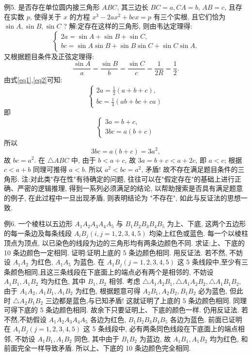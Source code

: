 例5. 是否存在单位圆内接三角形 $A B C$, 其三边长 $B C=a, C A=b$, $A B=c$, 且存在实数 $p$, 使得关于 $x$ 的方程 $x^3-2 a x^2+b c x=p$ 有三个实根, 且它们恰为 $\sin A, \sin B, \sin C$ ?
解:定存在这样的三角形, 则由韦达定理得:
$$
\left\{\begin{array}{l}
2 a=\sin A+\sin B+\sin C, \\
b c=\sin A \sin B+\sin B \sin C+\sin C \sin A .
\end{array}\right. \label{eq1}
$$
又根据题目条件及正弦定理得:
$$
\frac{\sin A}{a}=\frac{\sin B}{b}=\frac{\sin C}{c}=\frac{1}{2 R}=\frac{1}{2} .  \label{eq2}
$$
由式\ref{eq1},\ref{eq2}可知:
$$
\left\{\begin{array}{l}
2 a=\frac{1}{2}(a+b+c), \\
b c=\frac{1}{4}(a b+b c+c a) 
\end{array}\right.
$$
即
$$
\left\{\begin{array}{l}
3 a=b+c, \\
3 b c=a(b+c)
\end{array}\right. 
$$
所以
$$
3 b c=a(b+c)=3 a^2,
$$
故 $b c=a^2$.
在 $\triangle A B C$ 中, 由于 $b<a+c$, 故 $3 a=b+c<a+2 c$, 即 $a<c$; 根据 $c< a+b$ 同理可推得 $a<b$. 所以 $a^2<b c=a^2$, 矛盾! 故不存在满足题目条件的三角形.
注:对此类"存在性"有待确定的问题, 往往可以在"假定存在"的基础上进行正确、严密的逻辑推理, 得到一系列必须满足的结论, 以帮助搜索是否具有满足题意的例子, 在此过程中一旦出现矛盾, 则表明结论为 "不存在", 如此与反证法的思想一致.



例6. 一个棱柱以五边形 $A_1 A_2 A_3 A_4 A_5$ 与 $B_1 B_2 B_3 B_4 B_5$ 为上、下底, 这两个五边形的每一条边及每条线段 $A_i B_j(i, j=1,2,3,4,5)$ 均染上红色或蓝色.
每一个以棱柱顶点为顶点, 以已染色的线段为边的三角形均有两条边颜色不同.
求证:上、下底的 10 条边颜色一定相同.
证明:证明上底的 5 条边颜色相同.
用反证法.
若不然, 不妨设 $A_1 A_2$ 为红色, $A_1 A_5$ 为蓝色.
在 $A_1 B_j(j=1,2,3,4,5)$ 这 5 条线段中,至少有三条颜色相同,且这三条线段在下底面上的端点必有两个是相邻的, 不妨设 $A_1 B_1, A_1 B_2$ 均为红色, 其中 $B_1, B_2$ 相邻.
考虑 $\triangle A_1 A_2 B_1, \triangle A_1 A_2 B_2, \triangle A_1 B_1 B_2$, 由于 $A_1 A_2, A_1 B_1, A_1 B_2$ 为红色, 根据题意可得 $A_2 B_1, A_2 B_2, B_1 B_2$ 必为蓝色, 但此时 $\triangle A_2 B_1 B_2$ 三边都是蓝色,与已知矛盾! 这就证明了上底的 5 条边颜色相同.
同理可得下底的 5 条边颜色相同.
故余下只要证明上、下底的颜色一样.
仍用反证法.
若不然,不妨假设 $A_1 A_2 A_3 A_4 A_5$ 各边为红色, $B_1 B_2 B_3 B_4 B_5$ 各边为蓝色.
前面已证明在 $A_1 B_j(j=1,2,3,4,5)$ 这 5 条线段中, 必有两条同色线段在下底面上的端点相邻, 不妨设 $A_1 B_1, A_1 B_2$ 同色, 其中由于 $B_1 B_2$ 为蓝边, 故 $A_1 B_1, A_1 B_2$ 均为红色, 和前面完全一样导致矛盾.
所以上、下底的 10 条边颜色完全相同.



